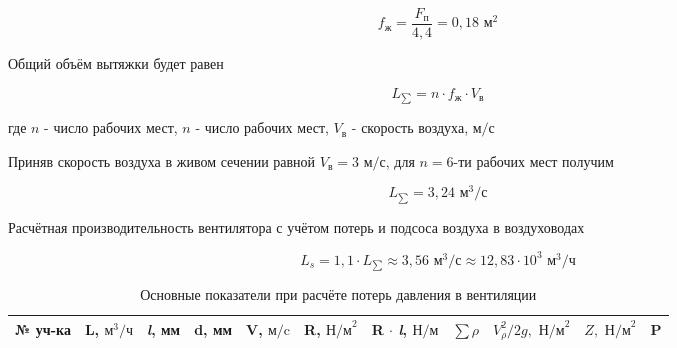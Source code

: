 \begin{equation}
\label{alive_section_are}
    f_\text{ж} = \frac{F_\text{п}}{4,4} = 0,18 \text{ м}^2
\end{equation}

Общий объём вытяжки будет равен

\begin{equation}
\label{overall_sucktion_volume}
    L_{\sum} = n \cdot f_\text{ж} \cdot V_\text{в}
\end{equation}

где $n$ - число рабочих мест,
$n$ - число рабочих мест,
$V_\text{в}$ - скорость воздуха, $\text{м/с}$

Приняв скорость воздуха в живом сечении равной $V_\text{в} = 3 \text{ м/с}$,
для $n = 6$-ти рабочих мест получим

$$
    L_{\sum} = 3,24 \text{ м}^3 / \text{с}
$$

Расчётная производительность вентилятора с учётом потерь и подсоса воздуха
в воздуховодах

\begin{equation}
\label{fan_productivity}
    L_s = 1,1 \cdot L_{\sum} \approx 3,56 \text{ м}^3 / \text{с} \approx 12,83 \cdot 10^3 \text{ м}^3 / \text{ч}
\end{equation}


\begin{table}[h]
    \centering
    \begin{tabular}{|l|r|r|r|r|r|r|r|r|r|r|}
    \hline
        № уч-ка & L, $\text{м}^3/\text{ч}$ & \textit{l}, мм & d, мм & V, $\text{м/c}$
        & R, $\text{Н/м}^2$ & R $\cdot$ \textit{l}, $\text{Н/м}$ & $\sum \rho$
        & $V_{\rho}^2 / 2g, \text{ Н/м}^2$ & $Z, \text{ Н/м}^2$ & P                     \\
    \hline


    \end{tabular}
    \caption{Основные показатели при расчёте потерь давления в вентиляции}
    \label{pressure_drop_calc_parameters}
\end{table}
